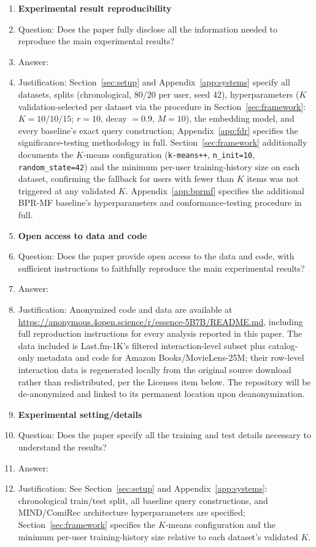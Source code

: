 \documentclass{article}
\begin{document}
\begin{enumerate}
\item {\bf Experimental result reproducibility}
    \item[] Question: Does the paper fully disclose all the information needed to reproduce the main experimental results?
    \item[] Answer: \answerYes{}
    \item[] Justification: Section~\ref{sec:setup} and Appendix~\ref{app:systems} specify all datasets, splits (chronological, 80/20 per user, seed 42), hyperparameters ($K$ validation-selected per dataset via the procedure in Section~\ref{sec:framework}: $K=10$/$10$/$15$; $r=10$, decay $=0.9$, $M=10$), the embedding model, and every baseline's exact query construction; Appendix~\ref{app:fdr} specifies the significance-testing methodology in full. Section~\ref{sec:framework} additionally documents the $K$-means configuration (\texttt{k-means++}, \texttt{n\_init=10}, \texttt{random\_state=42}) and the minimum per-user training-history size on each dataset, confirming the fallback for users with fewer than $K$ items was not triggered at any validated $K$. Appendix~\ref{app:bprmf} specifies the additional BPR-MF baseline's hyperparameters and conformance-testing procedure in full.

\item {\bf Open access to data and code}
    \item[] Question: Does the paper provide open access to the data and code, with sufficient instructions to faithfully reproduce the main experimental results?
    \item[] Answer: \answerYes{}
    \item[] Justification: Anonymized code and data are available at \url{https://anonymous.4open.science/r/essence-5B7B/README.md}, including full reproduction instructions for every analysis reported in this paper. The data included is Last.fm-1K's filtered interaction-level subset plus catalog-only metadata and code for Amazon Books/MovieLens-25M; their row-level interaction data is regenerated locally from the original source download rather than redistributed, per the Licenses item below. The repository will be de-anonymized and linked to its permanent location upon deanonymization.

\item {\bf Experimental setting/details}
    \item[] Question: Does the paper specify all the training and test details necessary to understand the results?
    \item[] Answer: \answerYes{}
    \item[] Justification: See Section~\ref{sec:setup} and Appendix~\ref{app:systems}: chronological train/test split, all baseline query constructions, and MIND/ComiRec architecture hyperparameters are specified; Section~\ref{sec:framework} specifies the $K$-means configuration and the minimum per-user training-history size relative to each dataset's validated $K$.


\end{enumerate}
\end{document}
